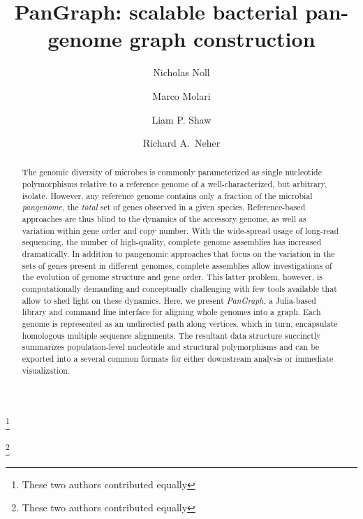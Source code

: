 \documentclass[aps,rmp,preprint,superscriptaddress,10pt,linenumbers]{revtex4-1}
\begin{document}
\title{PanGraph: scalable bacterial pan-genome graph construction}
\author{Nicholas Noll}
\thanks{These two authors contributed equally}
\author{Marco Molari}
\thanks{These two authors contributed equally}
\author{Liam P. Shaw}
\author{Richard A.~Neher}

\begin{abstract}
    The genomic diversity of microbes is commonly parameterized as single nucleotide polymorphisms relative to a reference genome of a well-characterized, but arbitrary, isolate.
    However, any reference genome contains only a fraction of the microbial \emph{pangenome}, the \textit{total} set of genes observed in a given species.
    Reference-based approaches are thus blind to the dynamics of the accessory genome, as well as variation within gene order and copy number.
    With the wide-spread usage of long-read sequencing, the number of high-quality, complete genome assemblies has increased dramatically.
    In addition to pangenomic approaches that focus on the variation in the sets of genes present in different genomes, complete assemblies allow investigations of the evolution of genome structure and gene order.
    This latter problem, however, is computationally demanding and conceptually challenging with few tools available that allow to shed light on these dynamics. 
    Here, we present \emph{PanGraph}, a Julia-based library and command line interface for aligning whole genomes into a graph.
    Each genome is represented as an undirected path along vertices, which in turn, encapsulate homologous multiple sequence alignments.
    The resultant data structure succinctly summarizes population-level nucleotide and structural polymorphisms and can be exported into a several common formats for either downstream analysis or immediate visualization.
\end{abstract}
\end{document}
